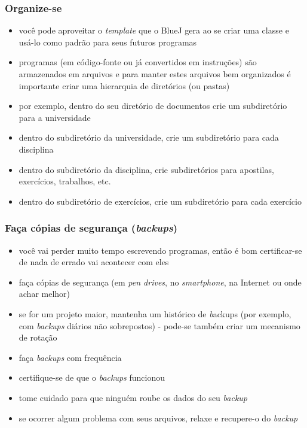 \documentclass[aspectratio=169]{beamer}
\begin{document}
\begin{frame}\frametitle{Organize-se}
\begin{itemize}
	\item você pode aproveitar o \emph{template} que o BlueJ gera ao se criar uma classe e usá-lo como padrão para seus futuros programas
	\item programas (em código-fonte ou já convertidos em instruções) são armazenados em arquivos e para manter estes arquivos bem organizados é importante criar uma hierarquia de diretórios (ou pastas)
	\item por exemplo, dentro do seu diretório de documentos crie um subdiretório para a universidade
	\item dentro do subdiretório da universidade, crie um subdiretório para cada disciplina
	\item dentro do subdiretório da disciplina, crie subdiretórios para apostilas, exercícios, trabalhos, etc.
	\item dentro do subdiretório de exercícios, crie um subdiretório para cada exercício
\end{itemize}
\end{frame}

\begin{frame}\frametitle{Faça cópias de segurança (\emph{backups})}
\begin{itemize}
	\item você vai perder muito tempo escrevendo programas, então é bom certificar-se de nada de errado vai acontecer com eles
	\item faça cópias de segurança (em \emph{pen drives}, no \emph{smartphone}, na Internet ou onde achar melhor)
	\item se for um projeto maior, mantenha um histórico de {\emph backups} (por exemplo, com \emph{backups} diários não sobrepostos) - pode-se também criar um mecanismo de rotação
	\item faça \emph{backups} com frequência
	\item certifique-se de que o \emph{backups} funcionou
	\item tome cuidado para que ninguém roube os dados do seu \emph{backup}
	\item se ocorrer algum problema com seus arquivos, relaxe e recupere-o do \emph{backup}
\end{itemize}
\end{frame}
\end{document}
